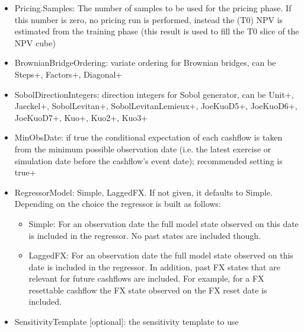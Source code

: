 \begin{itemize}
\item Pricing.Samples: The number of samples to be used for the pricing phase. If this number is zero, no pricing run is
  performed, instead the (T0) NPV is estimated from the training phase (this result is used to fill the T0 slice of the
  NPV cube)
\item BrownianBridgeOrdering: variate ordering for Brownian bridges, can be Steps+, Factors+, Diagonal+
\item SobolDirectionIntegers: direction integers for Sobol generator, can be Unit+, Jaeckel+, SobolLevitan+,
  SobolLevitanLemieux+, JoeKuoD5+, JoeKuoD6+, JoeKuoD7+, Kuo+, Kuo2+, Kuo3+
\item MinObsDate: if true the conditional expectation of each cashflow is taken from the minimum possible observation
  date (i.e. the latest exercise or simulation date before the cashflow's event date); recommended setting is true+
\item RegressorModel: Simple, LaggedFX. If not given, it defaults to Simple. Depending on the choice the regressor is
  built as follows:
  \begin{itemize}
    \item Simple: For an observation date the full model state observed on this date is included in the regressor. No
      past states are included though.
    \item LaggedFX: For an observation date the full model state observed on this date is included in the regressor. In
      addition, past FX states that are relevant for future cashflows are included. For example, for a FX resettable
      cashflow the FX state observed on the FX reset date is included.
  \end{itemize}
\item SensitivityTemplate [optional]: the sensitivity template to use
\end{itemize}

